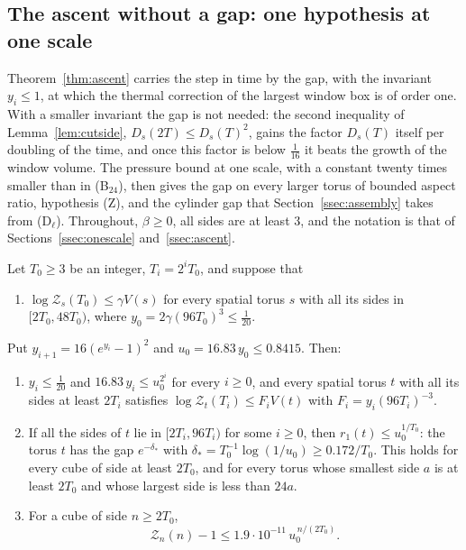 \subsection{The ascent without a gap: one hypothesis at one scale}
\label{ssec:onehyp}

Theorem~\ref{thm:ascent} carries the step in time by the gap, with the
invariant $y_i\le1$, at which the thermal correction of the largest window
box is of order one. With a smaller invariant the gap is not needed: the
second inequality of Lemma~\ref{lem:cutside}, $D_s(2T)\le D_s(T)^2$, gains
the factor $D_s(T)$ itself per doubling of the time, and once this factor is
below $\frac1{16}$ it beats the growth of the window volume. The pressure
bound at one scale, with a constant twenty times smaller than in
(B$_{24}$), then gives the gap on every larger torus of bounded aspect
ratio, hypothesis (Z), and the cylinder gap that
Section~\ref{ssec:assembly} takes from (D$_\ell$). Throughout, $\beta\ge0$,
all sides are at least $3$, and the notation is that of
Sections~\ref{ssec:onescale} and~\ref{ssec:ascent}.

\begin{theorem}\label{thm:ascentfree}
Let $T_0\ge3$ be an integer, $T_i=2^iT_0$, and suppose that
\begin{enumerate}[leftmargin=*]
\item[\textup{(B$^*$)}] $\log\mathcal Z_s(T_0)\le\gamma V(s)$ for every
spatial torus $s$ with all its sides in $[2T_0,48T_0)$, where $y_0=2\gamma
(96T_0)^3\le\frac1{20}$.
\end{enumerate}
Put $y_{i+1}=16(e^{y_i}-1)^2$ and $u_0=16.83\,y_0\le0.8415$. Then:
\begin{enumerate}[label=\textup{(\alph*)},leftmargin=*]
\item $y_i\le\frac1{20}$ and $16.83\,y_i\le u_0^{2^i}$ for every $i\ge0$, and
every spatial torus $t$ with all its sides at least $2T_i$ satisfies
$\log\mathcal Z_t(T_i)\le F_iV(t)$ with $F_i=y_i(96T_i)^{-3}$.
\item If all the sides of $t$ lie in $[2T_i,96T_i)$ for some $i\ge0$, then
$r_1(t)\le u_0^{1/T_0}$: the torus $t$ has the gap $e^{-\delta_*}$ with
$\delta_*=T_0^{-1}\log(1/u_0)\ge0.172/T_0$. This holds for every cube of side
at least $2T_0$, and for every torus whose smallest side $a$ is at least
$2T_0$ and whose largest side is less than $24a$.
\item For a cube of side $n\ge2T_0$,
\[
\mathcal Z_n(n)-1\le1.9\cdot10^{-11}\,u_0^{\,n/(2T_0)} .
\]
\end{enumerate}
\end{theorem}

